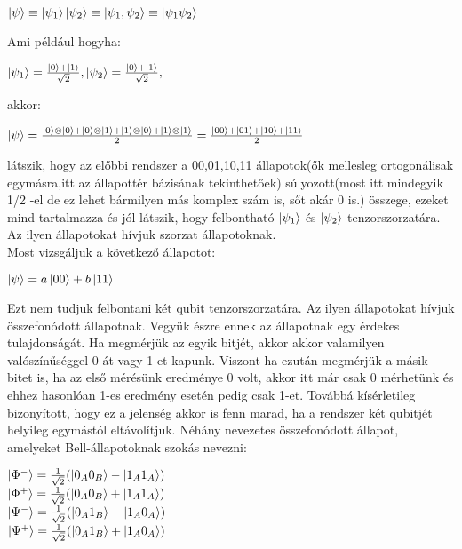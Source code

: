 \begin{center}
$ \ket{\psi} \equiv \ket{\psi_1}\ket{\psi_2} \equiv \ket{\psi_1,\psi_2} \equiv \ket{\psi_1\psi_2} $
\end{center}
Ami például hogyha:
\begin{center}
$ \ket{\psi_1} = \frac{\ket{0}+\ket{1}}{\sqrt{2}}, \ket{\psi_2}=\frac{\ket{0}+\ket{1}}{\sqrt{2}}, $
\end{center}
akkor:
\begin{center}
$ \ket{\psi}= \frac{\ket{0} \otimes \ket{0} +\ket{0}\otimes\ket{1}+\ket{1}\otimes\ket{0}+\ket{1}\otimes\ket{1}  }{2} = \frac{\ket{00}+\ket{01}+\ket{10}+\ket{11}}{2} $
\end{center}
látszik, hogy az előbbi rendszer a 00,01,10,11 állapotok(ők mellesleg ortogonálisak egymásra,itt az állapottér bázisának tekinthetőek) súlyozott(most itt mindegyik 1/2 -el de ez lehet bármilyen más komplex szám is, sőt akár 0 is.) összege, ezeket mind tartalmazza és jól látszik, hogy felbontható $\ket{\psi_1}$  és  $\ket{\psi_2}$  tenzorszorzatára. Az ilyen állapotokat hívjuk szorzat állapotoknak.\\
Most vizsgáljuk a következő állapotot:
\begin{center}
$ \ket{\psi} = a\ket{00}+b\ket{11} $
\end{center}
Ezt nem tudjuk felbontani két qubit tenzorszorzatára. Az ilyen állapotokat hívjuk összefonódott állapotnak. Vegyük észre ennek az állapotnak egy érdekes tulajdonságát. Ha megmérjük az egyik bitjét, akkor akkor valamilyen valószínűséggel 0-át vagy 1-et kapunk. Viszont ha ezután megmérjük a másik bitet is, ha az első mérésünk eredménye 0 volt, akkor itt már csak 0 mérhetünk és ehhez hasonlóan 1-es eredmény esetén pedig csak 1-et. Továbbá kísérletileg bizonyított, hogy ez a jelenség akkor is fenn marad, ha a rendszer két qubitjét helyileg egymástól eltávolítjuk.
Néhány nevezetes összefonódott állapot, amelyeket Bell-állapotoknak szokás nevezni:
\begin{center}
$ \ket{\Phi^-}= \frac{1}{\sqrt{2}}(\ket{0_A0_B}-\ket{1_A1_A}) $ \\
$ \ket{\Phi^+}= \frac{1}{\sqrt{2}}(\ket{0_A0_B}+\ket{1_A1_A}) $ \\
$ \ket{\Psi^-}= \frac{1}{\sqrt{2}}(\ket{0_A1_B}-\ket{1_A0_A}) $ \\
$ \ket{\Psi^+}= \frac{1}{\sqrt{2}}(\ket{0_A1_B}+\ket{1_A0_A}) $ \\

\end{center}

